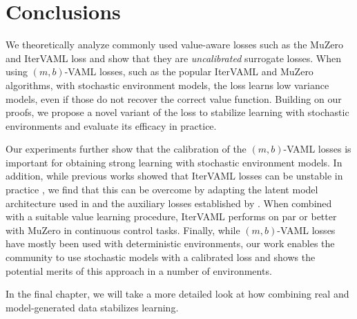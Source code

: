 \section{Conclusions}


We theoretically analyze commonly used value-aware losses such as the MuZero and IterVAML loss and show that they are \emph{uncalibrated} surrogate losses.
When using $(m,b)$-VAML losses, such as the popular IterVAML and MuZero algorithms, with stochastic environment models, the loss learns low variance models, even if those do not recover the correct value function.
Building on our proofs, we propose a novel variant of the loss to stabilize learning with stochastic environments and evaluate its efficacy in practice.

Our experiments further show that the calibration of the $(m,b)$-VAML losses is important for obtaining strong learning with stochastic environment models.
In addition, while previous works showed that IterVAML losses can be unstable in practice \parencite{lovatto2020decision,voelcker2022value}, we find that this can be overcome by adapting the latent model architecture used in \textcite{schrittwieser2020mastering} and the auxiliary losses established by \textcite{li2023efficient,hansen2022temporal}.
When combined with a suitable value learning procedure, IterVAML performs on par or better with MuZero in continuous control tasks.
Finally, while $(m,b)$-VAML losses have mostly been used with deterministic environments, our work enables the community to use stochastic models with a calibrated loss and shows the potential merits of this approach in a number of environments.

In the final chapter, we will take a more detailed look at how combining real and model-generated data stabilizes learning.

